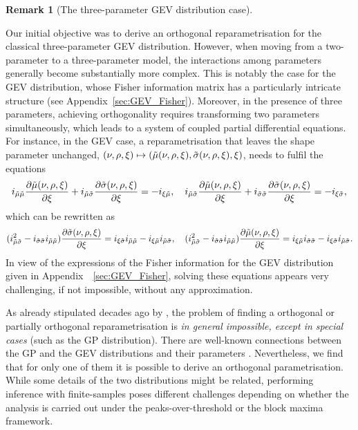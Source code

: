 \documentclass{article}
\newcommand{\1}{\mathds{1}}
\theoremstyle{definition}
\newtheorem{remark}{Remark}[section]
\begin{document}
\begin{remark}[The three-parameter GEV distribution case]\label{rem:3-GEV} 

Our initial objective was to derive an orthogonal reparametrisation for the classical three-parameter GEV distribution. However, when moving from a two-parameter to a three-parameter model, the interactions among parameters generally become substantially more complex. This is notably the case for the GEV distribution, whose Fisher information matrix has a particularly intricate structure (see Appendix~\ref{sec:GEV_Fisher}). Moreover, in the presence of three parameters, achieving orthogonality requires transforming two parameters simultaneously, which leads to a system of coupled partial differential equations. For instance, in the GEV case, a reparametrisation that leaves the shape parameter unchanged, $(\nu,\rho,\xi) \mapsto (\Tilde{\mu}(\nu,\rho,\xi),\Tilde{\sigma}(\nu,\rho,\xi),\xi)$, needs to fulfil the equations
\begin{equation*}
    i_{\Tilde{\mu} \Tilde{\mu}} \frac{\partial \Tilde{\mu}(\nu,\rho,\xi)}{\partial \xi} + i_{\Tilde{\mu} \Tilde{\sigma}}\frac{\partial \Tilde{\sigma}(\nu,\rho,\xi)}{\partial \xi} = -i_{\xi \Tilde{\mu}} , \quad
 i_{\Tilde{\mu} \Tilde{\sigma}} \frac{\partial \Tilde{\mu}(\nu,\rho,\xi)}{\partial \xi} + i_{\Tilde{\sigma}\Tilde{\sigma}}\frac{\partial \Tilde{\sigma}(\nu,\rho,\xi)}{\partial \xi} = -i_{\xi \Tilde{\sigma}},
\end{equation*}
which can be rewritten as
\begin{equation*}
    (i_{\Tilde{\mu} \Tilde{\sigma}}^2 - i_{\Tilde{\sigma}\Tilde{\sigma}}i_{\Tilde{\mu} \Tilde{\mu}})\frac{\partial \Tilde{\sigma}(\nu,\rho,\xi)}{\partial \xi} = i_{\xi \Tilde{\sigma}}i_{\Tilde{\mu} \Tilde{\mu}} - i_{\xi \Tilde{\mu}}i_{\Tilde{\mu} \Tilde{\sigma}}, \quad
    (i_{\Tilde{\mu} \Tilde{\sigma}}^2 - i_{\Tilde{\sigma}\Tilde{\sigma}}i_{\Tilde{\mu} \Tilde{\mu}})\frac{\partial \Tilde{\mu}(\nu,\rho,\xi)}{\partial \xi} =  i_{\xi \Tilde{\mu}}i_{\Tilde{\sigma}\Tilde{\sigma}} - i_{\xi \Tilde{\sigma}}i_{\Tilde{\mu} \Tilde{\sigma}}.
\end{equation*}
In view of the expressions of the Fisher information for the GEV distribution given in Appendix~~\ref{sec:GEV_Fisher}, solving these equations appears very challenging, if not impossible, without any approximation.

As already stipulated decades ago by \cite{huzurbazar1956sufficient}, the problem of finding a orthogonal or partially orthogonal reparametrisation  is \textit{in general impossible, except in special cases} (such as the GP distribution). There are well-known connections between the GP and the GEV distributions and their parameters \citep[see][]{Coles2001}. Nevertheless, we find that for only one of them it is possible to derive an orthogonal parametrisation. While some details of the two distributions might be related, performing inference with finite-samples poses different challenges depending on whether the analysis is carried out under the peaks-over-threshold or the block maxima framework.

\end{remark}
\end{document}
